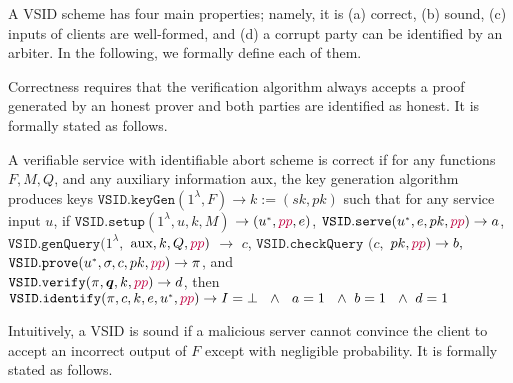\begin{definition}
\begin{itemize}


\end{itemize}
\end{definition}


A VSID scheme  has four main properties; namely, it is (a) correct, (b) sound, (c)  inputs of clients are well-formed, and (d) a corrupt party can be identified by an arbiter. In the following, we formally define each of them. 

Correctness requires that  the verification algorithm always accepts a proof generated by an honest prover and both parties are identified as honest.  It is formally stated as follows.

\begin{definition} A verifiable service with identifiable abort scheme  is  correct   if for any functions $F,M,Q$, and any auxiliary information $\text{aux}$, the key generation algorithm produces keys $\mathtt{VSID.keyGen}(1^{\lambda},F)\rightarrow k:=(sk,pk)$ such that for any service input $u$, if $\mathtt{VSID.setup}(1^{\lambda}, u,k,M)$ $\rightarrow (u^{\scriptscriptstyle *},{\color{purple}pp},e)$, $\mathtt{VSID.serve}(u^{\scriptscriptstyle *},e,pk,{\color{purple}pp})\rightarrow a$, $\mathtt{VSID.genQuery}(1^{\lambda}, $ $ \text{aux},k,Q,{\color{purple}pp})$ $ \rightarrow$ $ c$, $\mathtt{VSID.checkQuery}$ $(c, $ $pk,{\color{purple}pp})\rightarrow b,$  $\mathtt{VSID.prove}(u^{\scriptscriptstyle *},\sigma,c,pk,{\color{purple}pp})\rightarrow \pi$, and \\$\mathtt{VSID.verify}(\pi,\bm{q},k,{\color{purple}pp})\rightarrow d$, then  $\mathtt{VSID.identify}(\pi,c,k,e,u^{\scriptscriptstyle *},{\color{purple}pp})\rightarrow I=\bot \  \  \wedge \ \ a=1 \ \ \wedge \  b=1 \ \ \wedge \  d=1$
\end{definition}



Intuitively, a VSID is sound  if a malicious server cannot convince the client to accept an incorrect output of $F$ except with negligible probability. %
It is  formally stated as follows.

